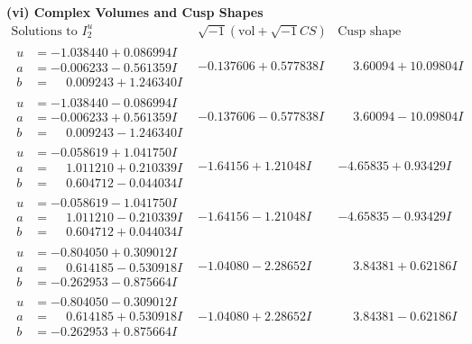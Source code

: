 \documentclass[1p]{elsarticle_modified}
\theoremstyle{definition}
\newcommand{\I}{\sqrt{-1}}
\begin{document}
\newpage\flushleft \textbf{(vi) Complex Volumes and Cusp Shapes}
$$\begin{array}{c|c|c}  
\text{Solutions to }I^u_{2}& \I (\text{vol} + \sqrt{-1}CS) & \text{Cusp shape}\\
 \hline 
\begin{aligned}
u &= -1.038440 + 0.086994 I \\
a &= -0.006233 - 0.561359 I \\
b &= \phantom{-}0.009243 + 1.246340 I\end{aligned}
 & -0.137606 + 0.577838 I & \phantom{-}3.60094 + 10.09804 I \\ \hline\begin{aligned}
u &= -1.038440 - 0.086994 I \\
a &= -0.006233 + 0.561359 I \\
b &= \phantom{-}0.009243 - 1.246340 I\end{aligned}
 & -0.137606 - 0.577838 I & \phantom{-}3.60094 - 10.09804 I \\ \hline\begin{aligned}
u &= -0.058619 + 1.041750 I \\
a &= \phantom{-}1.011210 + 0.210339 I \\
b &= \phantom{-}0.604712 - 0.044034 I\end{aligned}
 & -1.64156 + 1.21048 I & -4.65835 + 0.93429 I \\ \hline\begin{aligned}
u &= -0.058619 - 1.041750 I \\
a &= \phantom{-}1.011210 - 0.210339 I \\
b &= \phantom{-}0.604712 + 0.044034 I\end{aligned}
 & -1.64156 - 1.21048 I & -4.65835 - 0.93429 I \\ \hline\begin{aligned}
u &= -0.804050 + 0.309012 I \\
a &= \phantom{-}0.614185 - 0.530918 I \\
b &= -0.262953 - 0.875664 I\end{aligned}
 & -1.04080 - 2.28652 I & \phantom{-}3.84381 + 0.62186 I \\ \hline\begin{aligned}
u &= -0.804050 - 0.309012 I \\
a &= \phantom{-}0.614185 + 0.530918 I \\
b &= -0.262953 + 0.875664 I\end{aligned}
 & -1.04080 + 2.28652 I & \phantom{-}3.84381 - 0.62186 I \\ \hline\begin{aligned}

\end{aligned}
\end{array}$$
\end{document}
